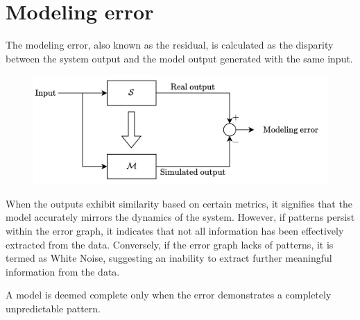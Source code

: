 \section{Modeling error}

The modeling error, also known as the residual, is calculated as the disparity between the system output and the model output generated with the same input.
\begin{figure}[H]
    \centering
    \includegraphics[width=0.7\linewidth]{images/error.png}
\end{figure}
When the outputs exhibit similarity based on certain metrics, it signifies that the model accurately mirrors the dynamics of the system. 
However, if patterns persist within the error graph, it indicates that not all information has been effectively extracted from the data. 
Conversely, if the error graph lacks of patterns, it is termed as  White Noise, suggesting an inability to extract further meaningful information from the data.
\begin{definition}
    A model is deemed complete only when the error demonstrates a completely unpredictable pattern.
\end{definition}